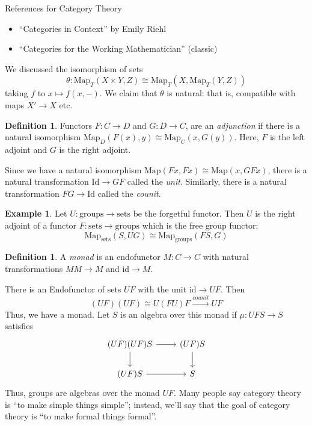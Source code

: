 \documentclass[10pt]{article}
\theoremstyle{definition}
\newtheorem{definition}[theorem]{Definition}
\newtheorem*{example}{Example}
\begin{document}
	References for Category Theory 
	\begin{itemize}
		\item ``Categories in Context'' by Emily Riehl
		\item ``Categories for the Working Mathematician'' (classic)
	\end{itemize} 
	We discussed the isomorphism of sets 
	$$\theta: \text{Map}_{T}(X\times Y,Z)\cong\text{Map}_{T}(X,\text{Map}_{T}(Y,Z)) $$
	taking $f$ to $x\mapsto f(x,-)$. We claim that $\theta$ is natural: that is, compatible with maps $X'\to X$ etc. 
	\begin{definition}
		Functors $F:C\to D$ and $G:D\to C$, are an \emph{adjunction} if there is a natural isomorphism $\text{Map}_{D}(F(x),y)\cong\text{Map}_{C}(x,G(y))$. Here, $F$ is the left adjoint and $G$ is the right adjoint. 
	\end{definition}
	Since we have a natural isomorphism $\text{Map}(Fx,Fx)\cong \text{Map}(x,GFx)$, there is a natural transformation $\text{Id}\to GF$ called the \emph{unit}. Similarly, there is a natural transformation $FG\to\text{Id}$ called the \emph{counit}. 
	\begin{example}
		Let $U:\text{groups}\to\text{sets}$ be the forgetful functor. Then $U$ is the right adjoint of a functor $F:\text{sets}\to\text{groups}$ which is the free group functor: 
		$$\text{Map}_{\text{sets}}(S,UG)\cong\text{Map}_{\text{groups}}(FS,G) $$ 
	\end{example}
	\begin{definition}
		A \emph{monad} is an endofunctor $M:C\to C$ with natural transformations $MM\to M$ and $\text{id}\to M$.
	\end{definition}
	There is an Endofunctor of sets $UF$ with the unit $\text{id}\to UF$. Then $$(UF)(UF)\cong U(FU)F\xrightarrow{counit}UF$$
	Thus, we have a monad. Let $S$ is an algebra over this monad if $\mu:UFS\to S$ satisfies
	$$\begin{tikzcd}
		(UF)(UF)S \arrow[r] \arrow[d] & (UF)S \arrow[d] \\
		(UF)S \arrow[r]               & S              
	\end{tikzcd}$$
	Thus, groups are algebras over the monad $UF$. Many people say category theory is ``to make simple things simple''; instead, we'll say that the goal of category theory is ``to make formal things formal''. 
	
\end{document}

